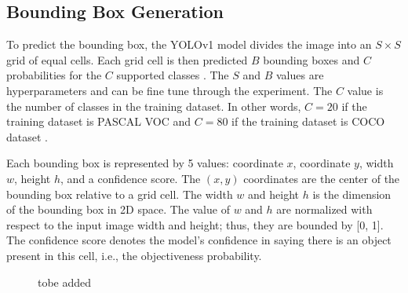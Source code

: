 \subsection{Bounding Box Generation}
To predict the bounding box, the YOLOv1 model divides the image into an $S \times S$ grid of equal cells. Each grid cell is then predicted $B$ bounding boxes and $C$ probabilities for the $C$ supported classes \cite{yolov1_2016}. The $S$ and $B$ values are hyperparameters and can be fine tune through the experiment. The $C$ value is the number of classes in the training dataset. In other words, $C=20$ if the training dataset is PASCAL VOC \cite{pascal_voc_2015} and $C=80$ if the training dataset is COCO dataset \cite{coco_2014}.

Each bounding box is represented by 5 values: coordinate $x$, coordinate $y$, width $w$, height $h$, and a confidence score. The $(x, y)$ coordinates are the center of the bounding box relative to a grid cell. The width $w$ and height $h$  is the dimension of the bounding box in 2D space. The value of $w$ and $h$ are normalized with respect to the input image width and height; thus, they are bounded by [0, 1]. The confidence score denotes the model's confidence in saying there is an object present in this cell, i.e., the objectiveness probability.

\begin{figure}[!ht]
    \centering
    \qquad \qquad
    \caption{{\color{red} tobe added}}
\end{figure}


